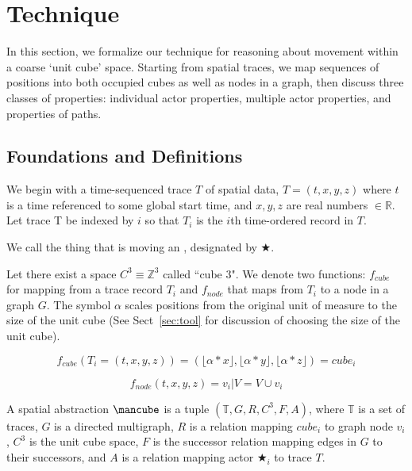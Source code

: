 \section{Technique}
\label{sec:technique}

In this section, we formalize our technique for reasoning about movement within a coarse `unit cube' space.
Starting from spatial traces, we map sequences of positions into both occupied cubes as well as nodes in a graph, then discuss three classes of properties: individual actor properties, multiple actor properties, and properties of paths.

\subsection{Foundations and Definitions}
We begin with a time-sequenced trace $T$ of spatial data, $T = (t,x,y,z)$ where $t$ is a time referenced to some global start time, and $x,y,z$ are real numbers $\in \mathbb{R}$. 
Let trace T be indexed by $i$ so that $T_i$ is the $i$th time-ordered record in $T$.

We call the thing that is moving an , designated by $\bigstar$.

Let there exist a space $C^3 \equiv \mathbb{Z}^3$ called ``cube 3".
We denote two functions: $f_{cube}$ for mapping from a trace record $T_i$ and $f_{node}$ that maps from $T_i$ to a node in a graph $G$. The symbol $\alpha$ scales positions from the original unit of measure to the size of the unit cube (See Sect~\ref{sec:tool} for discussion of choosing the size of the unit cube).

$$f_{cube}(T_i = (t,x,y,z)) = (\lfloor \alpha * x \rfloor, \lfloor \alpha * y \rfloor , \lfloor \alpha * z \rfloor ) = cube_i$$

$$f_{node}(t,x,y,z) = v_i | V = V \cup v_i$$


A spatial abstraction $\cube$ is a tuple $(\mathbb{T}, G, R, C^3, F, A)$, where $\mathbb{T}$ is a set of traces, $G$ is a directed multigraph, $R$ is a relation mapping $cube_i$ to graph node $v_i$, $C^3$ is the unit cube space, $F$ is the successor relation mapping edges in $G$ to their successors, and $A$ is a relation mapping actor $\bigstar_i$ to trace $T$.





